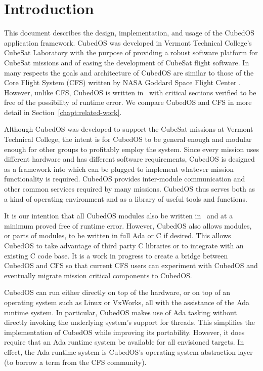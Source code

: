 \chapter{Introduction}
\label{chapt:introduction}

This document describes the design, implementation, and usage of the CubedOS application
framework. CubedOS was developed in Vermont Technical College's CubeSat Laboratory with the
purpose of providing a robust software platform for CubeSat missions and of easing the
development of CubeSat flight software. In many respects the goals and architecture of CubedOS
are similar to those of the Core Flight System (CFS) written by NASA Goddard Space Flight Center
\cite{cFE}. However, unlike CFS, CubedOS is written in \SPARK\ with critical sections verified
to be free of the possibility of runtime error. We compare CubedOS and CFS in more detail in
Section~\ref{chapt:related-work}.

Although CubedOS was developed to support the CubeSat missions at Vermont Technical College, the
intent is for CubedOS to be general enough and modular enough for other groups to profitably
employ the system. Since every mission uses different hardware and has different software
requirements, CubedOS is designed as a framework into which  can be plugged to
implement whatever mission functionality is required. CubedOS provides inter-module
communication and other common services required by many missions. CubedOS thus serves both as a
kind of operating environment and as a library of useful tools and functions.

It is our intention that all CubedOS modules also be written in \SPARK\ and at a minimum proved
free of runtime error. However, CubedOS also allows modules, or parts of modules, to be written
in full Ada or C if desired. This allows CubedOS to take advantage of third party C libraries or
to integrate with an existing C code base. It is a work in progress to create a bridge between
CubedOS and CFS so that current CFS users can experiment with CubedOS and eventually migrate
mission critical components to CubedOS.

CubedOS can run either directly on top of the hardware, or on top of an operating system such as
Linux or VxWorks, all with the assistance of the Ada runtime system. In particular, CubedOS
makes use of Ada tasking without directly invoking the underlying system's support for threads.
This simplifies the implementation of CubedOS while improving its portability. However, it does
require that an Ada runtime system be available for all envisioned targets. In effect, the Ada
runtime system is CubedOS's operating system abstraction layer (to borrow a term from the CFS
community).

